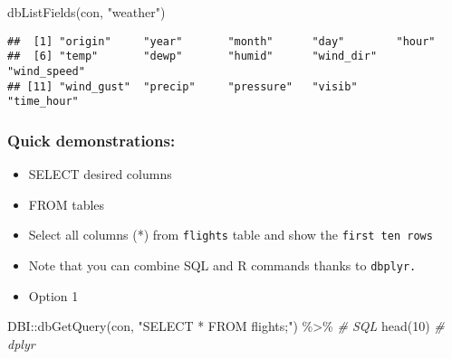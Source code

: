 \documentclass[
]{book}
\newenvironment{Shaded}{\begin{snugshade}}{\end{snugshade}}
\newcommand{\CommentTok}[1]{\textcolor[rgb]{0.56,0.35,0.01}{\textit{#1}}}
\newcommand{\DecValTok}[1]{\textcolor[rgb]{0.00,0.00,0.81}{#1}}
\newcommand{\FunctionTok}[1]{\textcolor[rgb]{0.00,0.00,0.00}{#1}}
\newcommand{\NormalTok}[1]{#1}
\newcommand{\SpecialCharTok}[1]{\textcolor[rgb]{0.00,0.00,0.00}{#1}}
\newcommand{\StringTok}[1]{\textcolor[rgb]{0.31,0.60,0.02}{#1}}
\begin{document}
\begin{Shaded}
\begin{Highlighting}[]
\FunctionTok{dbListFields}\NormalTok{(con, }\StringTok{"weather"}\NormalTok{)}
\end{Highlighting}
\end{Shaded}

\begin{verbatim}
##  [1] "origin"     "year"       "month"      "day"        "hour"      
##  [6] "temp"       "dewp"       "humid"      "wind_dir"   "wind_speed"
## [11] "wind_gust"  "precip"     "pressure"   "visib"      "time_hour"
\end{verbatim}

\hypertarget{quick-demonstrations}{%
\subsubsection{Quick demonstrations:}\label{quick-demonstrations}}

\begin{itemize}
\item
  SELECT desired columns
\item
  FROM tables
\item
  Select all columns (*) from \texttt{flights} table and show the \texttt{first\ ten\ rows}
\item
  Note that you can combine SQL and R commands thanks to \texttt{dbplyr.}
\item
  Option 1
\end{itemize}

\begin{Shaded}
\begin{Highlighting}[]
\NormalTok{DBI}\SpecialCharTok{::}\FunctionTok{dbGetQuery}\NormalTok{(con, }
                \StringTok{"SELECT * FROM flights;"}\NormalTok{) }\SpecialCharTok{\%\textgreater{}\%} \CommentTok{\# SQL}
  \FunctionTok{head}\NormalTok{(}\DecValTok{10}\NormalTok{) }\CommentTok{\# dplyr }
\end{Highlighting}
\end{Shaded}
\end{document}
